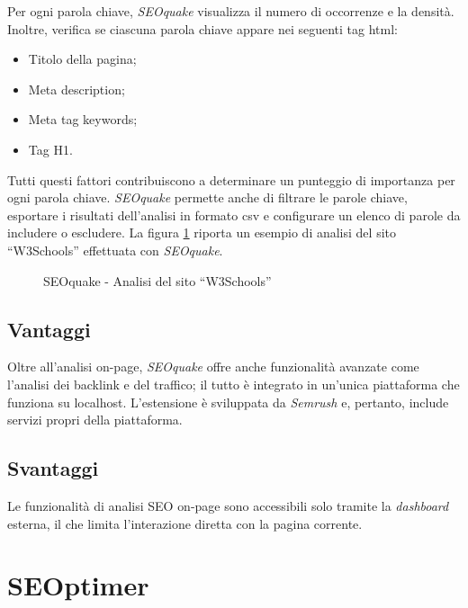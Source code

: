 \vspace{5pt}
\noindent Per ogni parola chiave, \textit{SEOquake} visualizza il numero di occorrenze e la densità. Inoltre, verifica se ciascuna parola chiave appare nei seguenti tag \gls{html}:
\begin{itemize}
    \item Titolo della pagina;
    \item Meta description;
    \item Meta tag keywords;
    \item Tag H1.
\end{itemize}

\vspace{5pt}
\noindent Tutti questi fattori contribuiscono a determinare un punteggio di importanza per ogni parola chiave. \textit{SEOquake} permette anche di filtrare le parole chiave, esportare i risultati dell'analisi in formato \gls{csv} e configurare un elenco di parole da includere o escludere. La figura \ref{fig:seoquake_w3schools} riporta un esempio di analisi del sito “W3Schools” effettuata con \textit{SEOquake}.

\begin{figure}[H]
    \centering 
    \caption{SEOquake - Analisi del sito “W3Schools”}
    \label{fig:seoquake_w3schools}
\end{figure}

\subsection{Vantaggi}
Oltre all'analisi \gls{on-page}, \textit{SEOquake} offre anche funzionalità avanzate come l'analisi dei \gls{backlink} e del traffico; il tutto è integrato in un'unica piattaforma che funziona su \gls{localhost}. L'estensione è sviluppata da \textit{Semrush} e, pertanto, include servizi propri della piattaforma.

\subsection{Svantaggi}
Le funzionalità di analisi SEO \gls{on-page} sono accessibili solo tramite la \textit{dashboard} esterna, il che limita l'interazione diretta con la pagina corrente.

\section{SEOptimer}

